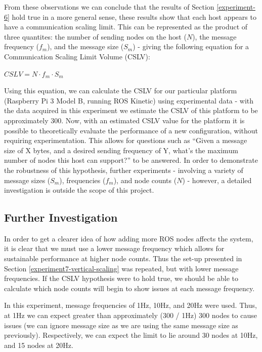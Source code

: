 \documentclass[../dissertation.tex]{subfiles}
\begin{document}
From these observations we can conclude that the results of Section \ref{experiment-6} hold true in a more general sense, these results show that each host appears to have a communication scaling limit. This can be represented as the product of three quantites: the number of sending nodes on the host ($N$), the message frequency ($f_m$), and the message size ($S_m$) - giving the following equation for a Communication Scaling Limit Volume (CSLV):

\begin{center}
$CSLV = N \cdot f_m \cdot S_m$
\end{center}

Using this equation, we can calculate the CSLV for our particular platform (Raspberry Pi 3 Model B, running ROS Kinetic) using experimental data - with the data acquired in this experiment we estimate the CSLV of this platform to be approximately 300. Now, with an estimated CSLV value for the platform it is possible to theoretically evaluate the performance of a new configuration, without requiring experimentation. This allows for questions such as ``Given a message size of X bytes, and a desired sending frequency of Y, what's the maximum number of nodes this host can support?'' to be answered. In order to demonstrate the robustness of this hypothesis, further experiments - involving a variety of message sizes ($S_m$), frequencies ($f_m$), and node counts ($N$) - however, a detailed investigation is outside the scope of this project.

\subsection{Further Investigation}
\label{exp-7-further}

In order to get a clearer idea of how adding more ROS nodes affects the system, it is clear that we must use a lower message frequency which allows for sustainable performance at higher node counts. Thus the set-up presented in Section \ref{experiment7-vertical-scaling} was repeated, but with lower message frequencies. If the CSLV hypothesis were to hold true, we should be able to calculate which node counts will begin to show issues at each message frequency.

In this experiment, message frequencies of 1Hz, 10Hz, and 20Hz were used. Thus, at 1Hz we can expect greater than approximately (300 / 1Hz) 300 nodes to cause issues (we can ignore message size as we are using the same message size as previously). Respectively, we can expect the limit to lie around 30 nodes at 10Hz, and 15 nodes at 20Hz.
\end{document}
